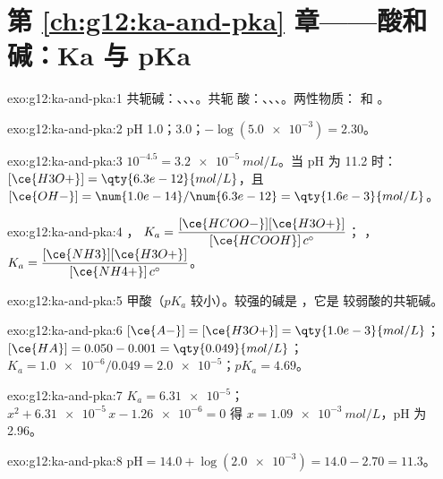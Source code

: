 \section*{第 \ref{ch:g12:ka-and-pka} 章——酸和碱：Ka 与 pKa}

\begin{solution}{exo:g12:ka-and-pka:1}
共轭碱：、、、。共轭
酸：、、、。两性物质：
和 。
\end{solution}

\begin{solution}{exo:g12:ka-and-pka:2}
pH 1.0；3.0；$-\log(\num{5.0e-3}) = 2.30$。
\end{solution}

\begin{solution}{exo:g12:ka-and-pka:3}
$10^{-4.5} = \qty{3.2e-5}{mol/L}$。当 pH 为 11.2 时：
$[\ce{H3O+}] = \qty{6.3e-12}{mol/L}$，且
$[\ce{OH-}] = \num{1.0e-14}/\num{6.3e-12} = \qty{1.6e-3}{mol/L}$。
\end{solution}

\begin{solution}{exo:g12:ka-and-pka:4}
，
$K_a = \dfrac{[\ce{HCOO-}][\ce{H3O+}]}{[\ce{HCOOH}]\,c^\circ}$；
，
$K_a = \dfrac{[\ce{NH3}][\ce{H3O+}]}{[\ce{NH4+}]\,c^\circ}$。
\end{solution}

\begin{solution}{exo:g12:ka-and-pka:5}
甲酸（$pK_a$ 较小）。较强的碱是 ，它是
较弱酸的共轭碱。
\end{solution}

\begin{solution}{exo:g12:ka-and-pka:6}
$[\ce{A-}] = [\ce{H3O+}] = \qty{1.0e-3}{mol/L}$；
$[\ce{HA}] = 0.050 - 0.001 = \qty{0.049}{mol/L}$；
$K_a = \num{1.0e-6}/0.049 = \num{2.0e-5}$；$pK_a = 4.69$。
\end{solution}

\begin{solution}{exo:g12:ka-and-pka:7}
$K_a = \num{6.31e-5}$；$x^2 + \num{6.31e-5}\,x - \num{1.26e-6} = 0$ 得
$x = \qty{1.09e-3}{mol/L}$，pH 为 2.96。
\end{solution}

\begin{solution}{exo:g12:ka-and-pka:8}
$\mathrm{pH} = 14.0 + \log(\num{2.0e-3}) = 14.0 - 2.70 = 11.3$。
\end{solution}

